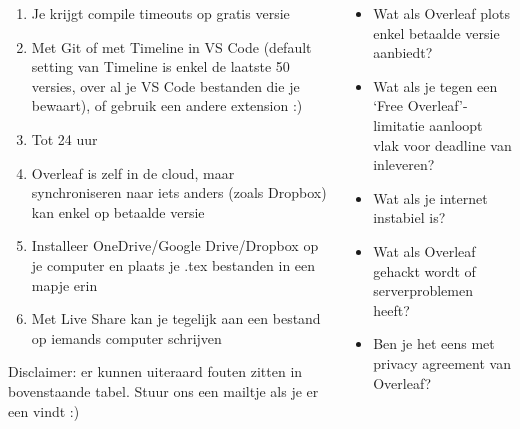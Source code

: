 \begin{frame}[fragile]
\begin{columns}
\begin{column}{0.6\textwidth}
{                %
                \tiny
                \fontsize{4}{6}\selectfont
                \begin{enumerate}[label={\arabic*)},itemsep=0pt,ref={\arabic*}]
                    \item Je krijgt compile timeouts op gratis versie\label{it:compileTimeout}
                    \item Met Git of met Timeline in VS Code (default setting van Timeline is enkel de laatste 50 versies, over al je VS Code bestanden die je bewaart),
                    of gebruik een andere extension :)\label{it:versionControl}
                    \item Tot 24 uur\label{it:overleafVersionControl}
                    \item Overleaf is zelf in de cloud, maar synchroniseren naar iets anders (zoals Dropbox)
                    kan enkel op betaalde versie\label{it:overleafCloud}
                    \item Installeer OneDrive/Google Drive/Dropbox op je computer en plaats je .tex
                    bestanden in een mapje erin\label{it:storageCloud}
                    \item Met Live Share kan je tegelijk aan een bestand op iemands computer schrijven
                    \label{it:liveShare}
                \end{enumerate}

                Disclaimer: er kunnen uiteraard fouten zitten in bovenstaande tabel. Stuur ons een
                mailtje als je er een vindt :)
            }
        \end{column}
        \begin{column}{0.4\textwidth}
            {
            \tiny
            \fontsize{6}{8}\selectfont
            \begin{itemize}[label=\textbullet]
                \item Wat als Overleaf plots enkel betaalde versie aanbiedt?
                \item Wat als je tegen een `Free Overleaf'-limitatie aanloopt vlak voor deadline van inleveren?
                \item Wat als je internet instabiel is?
                \item Wat als Overleaf gehackt wordt of serverproblemen heeft?
                \item Ben je het eens met privacy agreement van Overleaf?
            \end{itemize}

}
\end{column}
\end{columns}
\end{frame}
